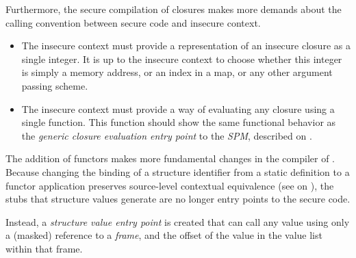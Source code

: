 Furthermore, the secure compilation of closures makes more demands about the calling convention between secure code and insecure context.
\begin{itemize}
\item 
The insecure context must provide a representation of an insecure closure as a single integer.
It is up to the insecure context to choose whether this integer is simply a memory address, or an index in a map, or any other argument passing scheme.
\item The insecure context must provide a way of evaluating any closure using a single function.
This function should show the same functional behavior as the \emph{generic closure evaluation entry point} to the \emph{SPM}, described on .
\end{itemize}

The addition of functors makes more fundamental changes in the compiler of .
Because changing the binding of a structure identifier from a static definition to a functor application preserves source-level contextual equivalence (see  on ), the stubs that structure values generate are no longer entry points to the secure code.

Instead, a \emph{structure value entry point} is created that can call any value using only a (masked) reference to a \emph{frame}, and the offset of the value in the value list within that frame.